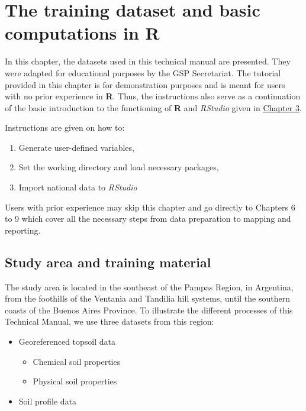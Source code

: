 \documentclass[
  10pt,
  b5paper,
  oneside]{book}
\providecommand{\tightlist}{%
  \setlength{\itemsep}{0pt}\setlength{\parskip}{0pt}}
\begin{document}
\hypertarget{the-training-dataset-and-basic-computations-in-r}{%
\chapter{\texorpdfstring{The training dataset and basic computations in \textbf{R}}{The training dataset and basic computations in R}}\label{the-training-dataset-and-basic-computations-in-r}}

In this chapter, the datasets used in this technical manual are presented. They were adapted for educational purposes by the GSP Secretariat.
The tutorial provided in this chapter is for demonstration purposes and is meant for users with no prior experience in \textbf{R}.
Thus, the instructions also serve as a continuation of the basic introduction to the functioning of \textbf{R} and \emph{RStudio} given in \href{https://fao-gsp.github.io/GSNmap-TM/setting-up-the-software-environment.html\#use-of-r-rstudio-and-r-packages}{Chapter 3}.

Instructions are given on how to:

\begin{enumerate}
\def\labelenumi{\arabic{enumi}.}
\tightlist
\item
  Generate user-defined variables,
\item
  Set the working directory and load necessary packages,
\item
  Import national data to \emph{RStudio}
\end{enumerate}

Users with prior experience may skip this chapter and go directly to Chapters 6 to 9 which cover all the necessary steps from data preparation to mapping and reporting.

\hypertarget{study-area-and-training-material}{%
\section{Study area and training material}\label{study-area-and-training-material}}

The study area is located in the southeast of the Pampas Region, in Argentina, from the foothills of the Ventania and Tandilia hill systems, until the southern coasts of the Buenos Aires Province.
To illustrate the different processes of this Technical Manual, we use three datasets from this region:

\begin{itemize}
\tightlist
\item
  Georeferenced topsoil data

  \begin{itemize}
  \tightlist
  \item
    Chemical soil properties
  \item
    Physical soil properties
  \end{itemize}
\item
  Soil profile data
\end{itemize}
\end{document}
